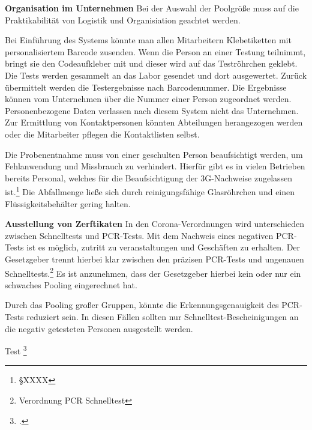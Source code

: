 \cleardoublepage

\textbf{Organisation im Unternehmen}\newline
Bei der Auswahl der Poolgröße muss auf die Praktikabilität von Logistik und Organisiation geachtet werden.

Bei Einführung des Systems könnte man allen Mitarbeitern Klebetiketten mit personalisiertem Barcode zusenden.
Wenn die Person an einer Testung teilnimmt, bringt sie den Codeaufkleber mit und dieser wird auf das Teströhrchen geklebt.
Die Tests werden gesammelt an das Labor gesendet und dort ausgewertet.
Zurück übermittelt werden die Testergebnisse nach Barcodenummer.
Die Ergebnisse können vom Unternehmen über die Nummer einer Person zugeordnet werden.
Personenbezogene Daten verlassen nach diesem System nicht das Unternehmen.
Zur Ermittlung von Kontaktpersonen könnten Abteilungen herangezogen werden oder die Mitarbeiter pflegen die Kontaktlisten selbst.

Die Probenentnahme muss von einer geschulten Person beaufsichtigt werden, um Fehlanwendung und Missbrauch zu verhindert.
Hierfür gibt es in vielen Betrieben bereits Personal, welches für die Beaufsichtigung der 3G-Nachweise zugelassen ist.\footnote{§XXXX}
Die Abfallmenge ließe sich durch reinigungsfähige Glasröhrchen und einen Flüssigkeitsbehälter gering halten.

\textbf{Ausstellung von Zerftikaten}\newline
In den Corona-Verordnungen wird unterschieden zwischen Schnelltests und PCR-Tests.
Mit dem Nachweis eines negativen PCR-Tests ist es möglich, zutritt zu veranstaltungen und Geschäften zu erhalten.
Der Gesetzgeber trennt hierbei klar zwischen den präzisen PCR-Tests und ungenauen Schnelltests.\footnote{Verordnung PCR Schnelltest}
Es ist anzunehmen, dass der Gesetzgeber hierbei kein oder nur ein schwaches Pooling eingerechnet hat.

Durch das Pooling großer Gruppen, könnte die Erkennungsgenauigkeit des PCR-Tests reduziert sein.
In diesen Fällen sollten nur Schnelltest-Bescheinigungen an die negativ getesteten Personen ausgestellt werden.

Test
\footcite{TD15}
\cleardoublepage